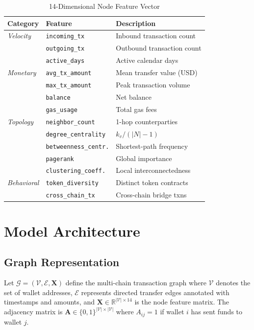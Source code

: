 \documentclass[conference]{IEEEtran}
\begin{document}
\begin{table}[htbp]
\caption{14-Dimensional Node Feature Vector}
\label{tab:features}
\centering
\small
\begin{tabular}{@{}lll@{}}
\toprule
\textbf{Category} & \textbf{Feature} & \textbf{Description} \\
\midrule
\textit{Velocity} & \texttt{incoming\_tx} & Inbound transaction count \\
& \texttt{outgoing\_tx} & Outbound transaction count \\
& \texttt{active\_days} & Active calendar days \\
\midrule
\textit{Monetary} & \texttt{avg\_tx\_amount} & Mean transfer value (USD) \\
& \texttt{max\_tx\_amount} & Peak transaction volume \\
& \texttt{balance} & Net balance \\
& \texttt{gas\_usage} & Total gas fees \\
\midrule
\textit{Topology} & \texttt{neighbor\_count} & 1-hop counterparties \\
& \texttt{degree\_centrality} & $k_v / (|N|-1)$ \\
& \texttt{betweenness\_centr.} & Shortest-path frequency \\
& \texttt{pagerank} & Global importance \\
& \texttt{clustering\_coeff.} & Local interconnectedness \\
\midrule
\textit{Behavioral} & \texttt{token\_diversity} & Distinct token contracts \\
& \texttt{cross\_chain\_tx} & Cross-chain bridge txns \\
\bottomrule
\end{tabular}
\end{table}

\section{Model Architecture}
\label{sec:model}

\subsection{Graph Representation}
Let $\mathcal{G} = (\mathcal{V}, \mathcal{E}, \mathbf{X})$ define the multi-chain transaction graph where $\mathcal{V}$ denotes the set of wallet addresses, $\mathcal{E}$ represents directed transfer edges annotated with timestamps and amounts, and $\mathbf{X} \in \mathbb{R}^{|\mathcal{V}| \times 14}$ is the node feature matrix. The adjacency matrix is $\mathbf{A} \in \{0,1\}^{|\mathcal{V}| \times |\mathcal{V}|}$ where $A_{ij} = 1$ if wallet $i$ has sent funds to wallet $j$.
\end{document}
